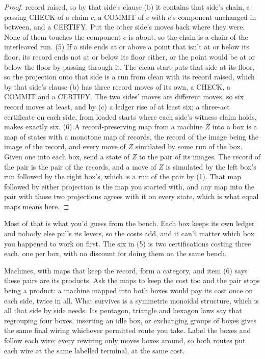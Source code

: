 \documentclass[11pt,twoside]{article}
\theoremstyle{thielethm}
\theoremstyle{thieledef}
\theoremstyle{thieledef}
\theoremstyle{thieledef}
\theoremstyle{thielethm}
\theoremstyle{thieleobs}
\theoremstyle{thielethm}
\begin{document}
\begin{proof}
record raised, so by that side's clause (b) it contains that side's chain, a
passing CHECK of a claim $c$, a COMMIT of $c$ with $c$'s component unchanged in between, and a
CERTIFY. Put the other side's moves back where they were. None of them touches the component $c$
is about, so the chain is a chain of the interleaved run. (5) If a side ends at or above a point
that isn't at or below its floor, its record ends not at or below its floor either, or the point
would be at or below the floor by passing through it. The clean start puts that side at its
floor, so the projection onto that side is a run from clean with its record raised, which by that
side's clause (b) has three record moves of its own, a CHECK, a COMMIT and a CERTIFY. The two
sides' moves are different moves, so six record
moves at least, and by (c) a ledger rise of at least six; a three-act certificate on each side,
from loaded starts where each side's witness claim holds, makes exactly six. (6) A
record-preserving map from a machine $Z$ into a box is a map of states with a monotone map of
records, the record of the image being the image of the record, and every move of $Z$ simulated by
some run of the box. Given one into each box, send a state of $Z$ to the pair of its images. The
record of the pair is the pair of the records, and a move of $Z$ is simulated by the left box's run
followed by the right box's, which is a run of the pair by (1). That map followed by either
projection is the map you started with, and any map into the pair with those two projections
agrees with it on every state, which is what equal maps means here.
\end{proof}

Most of that is what you'd guess from the bench. Each box keeps its own ledger and nobody else pulls
its levers, so the costs add, and it can't matter which box you happened to work on first. The six in
(5) is two certifications costing three each, one per box, with no discount for doing them on the
same bench.

Machines, with maps that keep the record, form a category, and item (6) says these pairs are its
products. Ask the maps to keep the cost too and the pair stops being a product: a machine mapped
into both boxes would pay its cost once on each side, twice in all. What survives is a symmetric
monoidal structure, which is all that side by side needs. Its pentagon, triangle and hexagon laws
say that regrouping four boxes, inserting an idle box, or exchanging groups of boxes gives the same
final wiring whichever permitted route you take. Label the boxes and follow each wire: every
rewiring only moves boxes around, so both routes put each wire at the same labelled terminal, at
the same cost.
\end{document}
